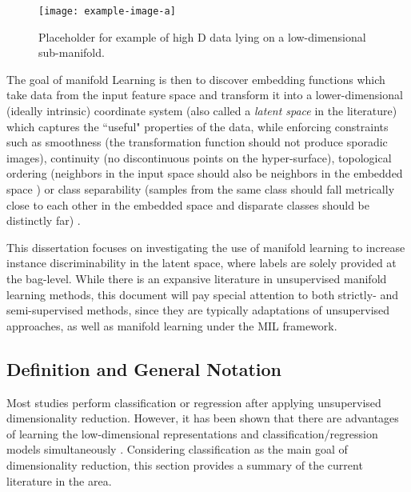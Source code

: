 \begin{center}
	\begin{figure*}[h]
		\centering
		\texttt{[image: example-image-a]}
		\caption[Example pose data manifold.]{Placeholder for example of high D data lying on a low-dimensional sub-manifold.}
		\label{fig:manifold_eg}
	\end{figure*}
\end{center}

The goal of manifold Learning is then to discover embedding functions which take data from the input feature space and transform it into a lower-dimensional (ideally intrinsic) coordinate system (also called a \textit{latent space} in the literature) which captures the ``useful" properties of the data, while enforcing constraints such as smoothness (the transformation function should not produce sporadic images), continuity (no discontinuous points on the hyper-surface), topological ordering (neighbors in the input space should also be neighbors in the embedded space ) or class separability (samples from the same class should fall metrically close to each other in the embedded space and disparate classes should be distinctly far) \citep{Vural2018StudySupervisedManifoldLearning}.

This dissertation focuses on investigating the use of manifold learning to increase instance discriminability in the latent space, where labels are solely provided at the bag-level.   While there is an expansive literature in unsupervised manifold learning methods, this document will pay special attention to both strictly- and semi-supervised methods, since they are typically adaptations of unsupervised approaches, as well as manifold learning under the MIL framework.

\subsection{Definition and General Notation}
Most studies perform classification or regression after applying unsupervised dimensionality reduction.  However, it has been shown that there are advantages of learning the low-dimensional representations and classification/regression models simultaneously \citep{Chao2019RecentAdvancesSupervisedDimRed,Rish2008SupDimRedGLM}.  Considering classification as the main goal of dimensionality reduction, this section provides a summary of the current literature in the area. \newline


